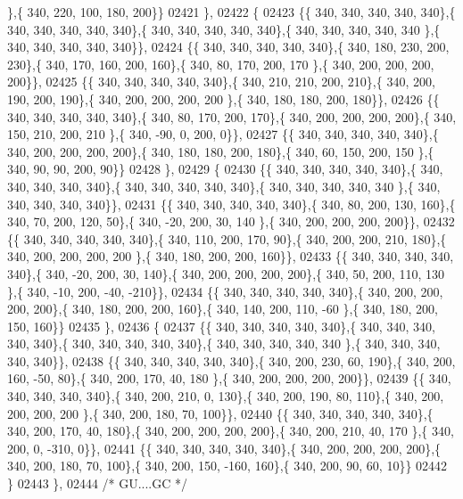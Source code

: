 \begin{DoxyCode}
      \},\{ 340, 220, 100, 180, 200\}\}
02421 \},
02422 \{
02423 \{\{ 340, 340, 340, 340, 340\},\{ 340, 340, 340, 340, 340\},\{ 340, 340, 340, 340, 340\},\{ 340, 340, 340, 340, 340
      \},\{ 340, 340, 340, 340, 340\}\},
02424 \{\{ 340, 340, 340, 340, 340\},\{ 340, 180, 230, 200, 230\},\{ 340, 170, 160, 200, 160\},\{ 340,  80, 170, 200, 170
      \},\{ 340, 200, 200, 200, 200\}\},
02425 \{\{ 340, 340, 340, 340, 340\},\{ 340, 210, 210, 200, 210\},\{ 340, 200, 190, 200, 190\},\{ 340, 200, 200, 200, 200
      \},\{ 340, 180, 180, 200, 180\}\},
02426 \{\{ 340, 340, 340, 340, 340\},\{ 340,  80, 170, 200, 170\},\{ 340, 200, 200, 200, 200\},\{ 340, 150, 210, 200, 210
      \},\{ 340, -90,   0, 200,   0\}\},
02427 \{\{ 340, 340, 340, 340, 340\},\{ 340, 200, 200, 200, 200\},\{ 340, 180, 180, 200, 180\},\{ 340,  60, 150, 200, 150
      \},\{ 340,  90,  90, 200,  90\}\}
02428 \},
02429 \{
02430 \{\{ 340, 340, 340, 340, 340\},\{ 340, 340, 340, 340, 340\},\{ 340, 340, 340, 340, 340\},\{ 340, 340, 340, 340, 340
      \},\{ 340, 340, 340, 340, 340\}\},
02431 \{\{ 340, 340, 340, 340, 340\},\{ 340,  80, 200, 130, 160\},\{ 340,  70, 200, 120,  50\},\{ 340, -20, 200,  30, 140
      \},\{ 340, 200, 200, 200, 200\}\},
02432 \{\{ 340, 340, 340, 340, 340\},\{ 340, 110, 200, 170,  90\},\{ 340, 200, 200, 210, 180\},\{ 340, 200, 200, 200, 200
      \},\{ 340, 180, 200, 200, 160\}\},
02433 \{\{ 340, 340, 340, 340, 340\},\{ 340, -20, 200,  30, 140\},\{ 340, 200, 200, 200, 200\},\{ 340,  50, 200, 110, 130
      \},\{ 340, -10, 200, -40, -210\}\},
02434 \{\{ 340, 340, 340, 340, 340\},\{ 340, 200, 200, 200, 200\},\{ 340, 180, 200, 200, 160\},\{ 340, 140, 200, 110, -60
      \},\{ 340, 180, 200, 150, 160\}\}
02435 \},
02436 \{
02437 \{\{ 340, 340, 340, 340, 340\},\{ 340, 340, 340, 340, 340\},\{ 340, 340, 340, 340, 340\},\{ 340, 340, 340, 340, 340
      \},\{ 340, 340, 340, 340, 340\}\},
02438 \{\{ 340, 340, 340, 340, 340\},\{ 340, 200, 230,  60, 190\},\{ 340, 200, 160, -50,  80\},\{ 340, 200, 170,  40, 180
      \},\{ 340, 200, 200, 200, 200\}\},
02439 \{\{ 340, 340, 340, 340, 340\},\{ 340, 200, 210,   0, 130\},\{ 340, 200, 190,  80, 110\},\{ 340, 200, 200, 200, 200
      \},\{ 340, 200, 180,  70, 100\}\},
02440 \{\{ 340, 340, 340, 340, 340\},\{ 340, 200, 170,  40, 180\},\{ 340, 200, 200, 200, 200\},\{ 340, 200, 210,  40, 170
      \},\{ 340, 200,   0, -310,   0\}\},
02441 \{\{ 340, 340, 340, 340, 340\},\{ 340, 200, 200, 200, 200\},\{ 340, 200, 180,  70, 100\},\{ 340, 200, 150, -160, 
      160\},\{ 340, 200,  90,  60,  10\}\}
02442 \}
02443 \},
02444 \textcolor{comment}{/* GU....GC */}

\end{DoxyCode}
